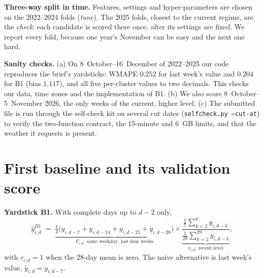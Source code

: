 \documentclass[10pt,a4paper]{article}
\begin{document}
\textbf{Three-way split in time.} Features, settings and hyper-parameters are chosen on the
2022--2024 folds (\emph{tune}). The 2025 folds, closest to the current regime, are the
\emph{check}: each candidate is scored there once, after its settings are fixed. We report every
fold, because one year's November can be easy and the next one hard.

\textbf{Sanity checks.}
(a) On 8~October--16~December of 2022--2025 our code reproduces the brief's yardsticks:
WMAPE $0.252$ for last week's value and $0.204$ for B1 (bias $1.117$), and all five per-cluster
values to two decimals. This checks our data, time zones and the implementation of B1.
(b) We also score 8~October--5~November 2026, the only weeks of the current, higher level.
(c) The submitted file is run through the self-check kit on several cut dates
(\texttt{selfcheck.py --cut-at}) to verify the two-function contract, the 15-minute and 6~GB
limits, and that the weather it requests is present.

\section{First baseline and its validation score}

\textbf{Yardstick B1.} With complete days up to $d-2$ only,
\[
  \hat y^{B1}_{i,d} \;=\;
  \underbrace{\tfrac14\bigl(y_{i,d-7}+y_{i,d-14}+y_{i,d-21}+y_{i,d-28}\bigr)}_{F_{i,d}:\ \text{same weekday, last four weeks}}
  \times
  \underbrace{\frac{\tfrac17\sum_{k=2}^{8} y_{i,d-k}}{\tfrac1{28}\sum_{k=2}^{29} y_{i,d-k}}}_{r_{i,d}:\ \text{recent level}},
\]
with $r_{i,d}=1$ when the 28-day mean is zero. The naive alternative is last week's value,
$\hat y_{i,d}=y_{i,d-7}$.
\end{document}
